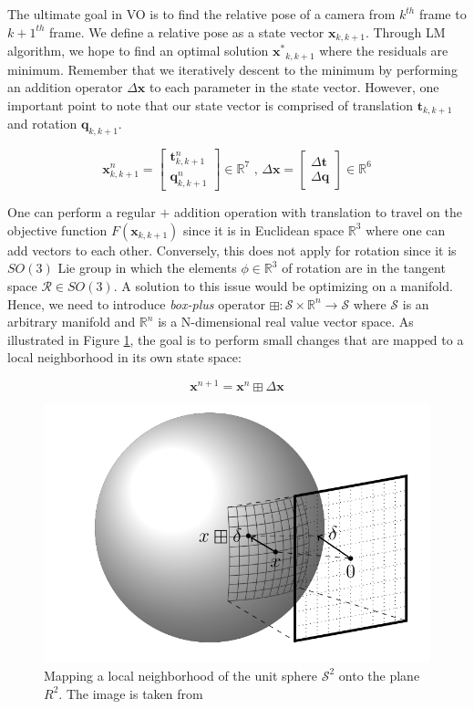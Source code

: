 \documentclass[a4paper]{report}
\numberwithin{figure}{section}
\newcommand{\R}{\mathbb{R}}
\begin{document}
\begin{appendices}
The ultimate goal in VO is to find the relative pose of a camera from 
$k^{th}$ frame to $k+1^{th}$ frame. 
We define a relative pose as a state vector $\mathbf{x}_{k,k+1}$. 
Through LM algorithm, we hope to 
find an optimal solution $\mathbf{x^*}_{k,k+1}$ where the residuals are 
minimum.
Remember that we iteratively descent to the minimum by performing an 
addition operator $\Delta \mathbf{x}$ to each parameter in the state vector. 
However, one important point to note that our state vector is comprised of 
translation $\mathbf{t}_{k,k+1}$ and rotation $\mathbf{q}_{k,k+1}$. 

\begin{equation}
  \mathbf{x}^n_{k,k+1} = \begin{bmatrix} \mathbf{t}^n_{k,k+1} \\ \mathbf{q}^n_{k,k+1} \end{bmatrix} \in \R^7
  \text{ ,   } 
  \Delta \mathbf{x} = \begin{bmatrix} \Delta \mathbf{t} \\ \Delta \mathbf{q} \end{bmatrix} \in \R^6
\end{equation}

One can perform a regular $+$ addition operation with translation 
to travel on the objective function $F(\mathbf{x}_{k,k+1})$ since 
it is in Euclidean space $\R^3$ where one can add vectors to each other. 
Conversely, this does not apply for rotation 
since it is $SO(3)$ Lie group in which the elements $\phi \in \R^3$ of 
rotation 
are in the tangent space $\mathcal{R} \in SO(3)$.
A solution to this issue would be optimizing on a manifold.
Hence, we need to introduce \textit{box-plus} operator
$\boxplus : \mathcal{S} \times \R^n \rightarrow \mathcal{S}$ where $\mathcal{S}$ 
is an arbitrary manifold and $\R^n$ is a N-dimensional real value vector space. 
As illustrated in Figure \ref{fig:manifold}, 
the goal is to perform small changes that are mapped to a local neighborhood in 
its own state space:

\begin{equation}
  \mathbf{x}^{n+1} = \mathbf{x}^{n} \boxplus \Delta \mathbf{x}
\end{equation}

\begin{figure}[H]
	\centering
  \includegraphics[width=0.5\linewidth,natwidth=640,natheight=640]
  {fig/ref_imgs/sphere_manifold.png}
  \caption[Sphere Manifold]
  {Mapping a local neighborhood of the unit sphere $\mathcal{S}^2$ 
  onto the plane $R^2$. The image is taken from \parencite{Hertzberg2013}}
	\label{fig:manifold}
\end{figure}



\end{appendices}
\end{document}
